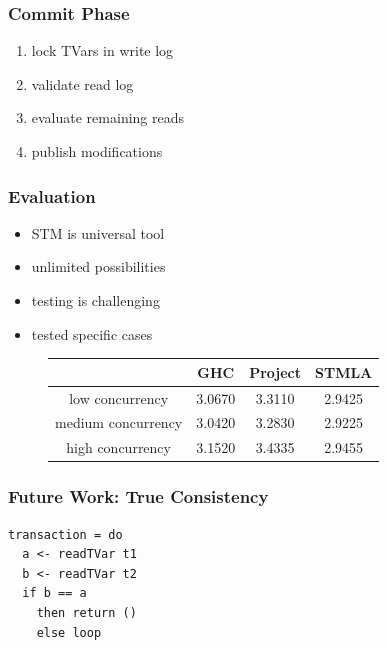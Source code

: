 \documentclass{beamer}
\begin{document}
  
  \begin{frame}
  \frametitle{Commit Phase}
  \begin{enumerate}\setlength\itemsep{1em}
   \item lock TVars in write log
   \item validate read log
   \item evaluate remaining reads
   \item publish modifications
  \end{enumerate}
  \end{frame}
  
  

  \begin{frame}
  \frametitle{Evaluation}
  \begin{itemize}\setlength\itemsep{1em}
   \item STM is universal tool
   \item unlimited possibilities
   \item testing is challenging
   \item tested specific cases
  \end{itemize}
  \end{frame}

   
\begin{frame}
\begin{figure}
\centering
 \begin{tabular}[center]{|c|c|c|c|}
  \hline
	                       & GHC    & Project & STMLA  \\ \hline
  low concurrency     & 3.0670 &  3.3110 & 2.9425 \\ \hline
  medium concurrency  & 3.0420 &  3.2830 & 2.9225 \\ \hline
  high concurrency    & 3.1520 &  3.4335 & 2.9455 \\ \hline
 \end{tabular}
\end{figure}
\end{frame}
  
  
 
\begin{frame}[fragile]
\frametitle{Future Work: True Consistency}
\begin{lstlisting}
transaction = do 
  a <- readTVar t1
  b <- readTVar t2
  if b == a 
    then return ()
    else loop
\end{lstlisting}
\end{frame} 
 
\end{document}
